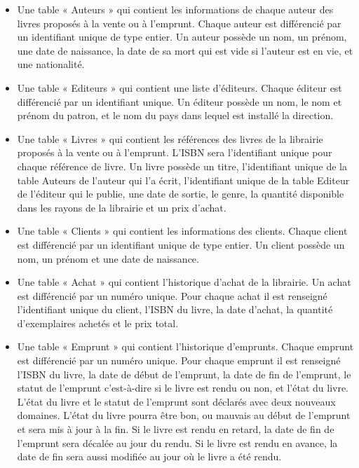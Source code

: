 \documentclass[10pt,a4paper,parskip=full*,DIV=11]{scrartcl}
\begin{document}
\begin{itemize}[itemsep = 1em]
    \item Une table « Auteurs » qui contient les informations de chaque auteur des livres proposés à la vente ou à l’emprunt. Chaque auteur est différencié par un identifiant unique de 
    type entier. Un auteur possède un nom, un prénom, une date de naissance, la date de sa mort qui est vide si l’auteur est en vie, et une nationalité.\
    \
    \item Une table « Editeurs » qui contient une liste d’éditeurs. Chaque éditeur est différencié par un identifiant unique. Un éditeur possède un nom, le nom et prénom du patron, et le nom du 
    pays dans lequel est installé la direction.\
    \
    \item Une table « Livres » qui contient les références des livres de la librairie proposés à la vente ou à l’emprunt. L’ISBN sera l’identifiant unique pour chaque référence de livre. 
    Un livre possède un titre, l’identifiant unique de la table Auteurs de l’auteur qui l’a écrit, 
    l’identifiant unique de la table Editeur de l’éditeur qui le publie, une date de sortie, le genre, la quantité disponible dans les rayons de la librairie et un prix d’achat.\
    \
    \item Une table « Clients » qui contient les informations des clients. Chaque client est différencié par un identifiant unique de type entier. Un client possède un nom, un prénom et une date de 
    naissance.\
    \
    \item Une table « Achat » qui contient l’historique d’achat de la librairie. Un achat est différencié par un numéro unique. Pour chaque achat il est renseigné l’identifiant unique du client, l’ISBN du livre, la date d’achat, 
    la quantité d’exemplaires achetés et le prix total.\
    \
    \item Une table « Emprunt » qui contient l’historique d’emprunts. Chaque emprunt est différencié par un numéro unique. Pour chaque emprunt il est renseigné l’ISBN du livre, la date de début 
    de l’emprunt, la date de fin de l’emprunt, le statut de l’emprunt c’est-à-dire si le livre est rendu ou non, et l’état du livre. L’état du livre et le statut de l’emprunt sont déclarés avec
     deux nouveaux domaines. L’état du livre pourra être bon, ou mauvais au début de l’emprunt et sera mis à jour à la fin. Si le livre
      est rendu en retard, la date de fin de l’emprunt sera décalée au jour du rendu. Si le livre est rendu en avance, la date de fin sera aussi modifiée au jour 
      où le livre a été rendu.
    
\end{itemize}
\end{document}
